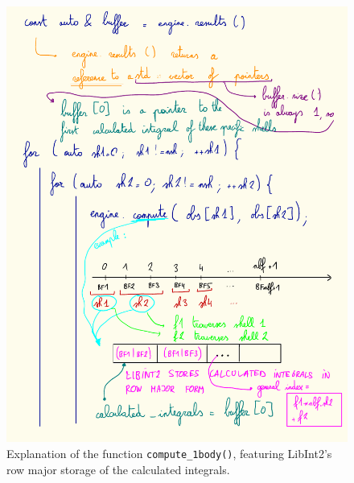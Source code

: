 \documentclass[12pt]{article}
\begin{document}
    \begin{figure}[H]
        \centering
        \includegraphics[scale=1]{figures/compute1body}
        \caption{Explanation of the function \lstinline{compute_1body()}, featuring LibInt2's row major storage of the calculated integrals.}
        \label{fig:compute}
    \end{figure}



\newpage


\end{document}
